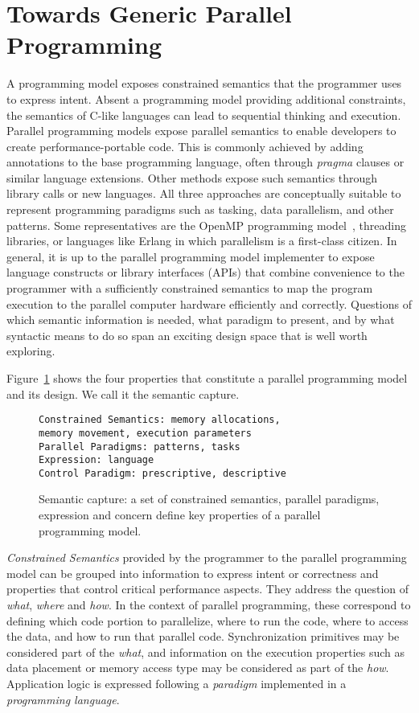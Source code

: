 \section{Towards Generic Parallel Programming}\label{chap:background}

A programming model exposes constrained semantics that the programmer uses to express intent. Absent a programming model providing additional constraints, the semantics of C-like languages can lead to sequential thinking and execution. Parallel programming models expose parallel semantics to enable developers to create performance-portable code. This is commonly achieved by adding annotations to the base programming language, often through \emph{pragma} clauses or similar language extensions. Other methods expose such semantics through library calls or new languages. All three approaches are conceptually suitable to represent programming paradigms such as tasking, data parallelism, and other patterns. Some representatives are the OpenMP programming model~\cite{OPENMP}, threading libraries, or languages like Erlang\cite{ERLANG} in which parallelism is a first-class citizen. In general, it is up to the parallel programming model implementer to expose language constructs or library interfaces (APIs) that combine convenience to the programmer with a sufficiently constrained semantics to map the program execution to the parallel computer hardware efficiently and correctly. Questions of which semantic information is needed, what paradigm to present, and by what syntactic means to do so span an exciting design space that is well worth exploring.

 Figure~\ref{figSemCapture} shows the four properties that constitute a parallel programming model and its design. We call it the semantic capture.

\begin{figure}[h]
\begin{verbatim}
Constrained Semantics: memory allocations, 
memory movement, execution parameters
Parallel Paradigms: patterns, tasks
Expression: language 
Control Paradigm: prescriptive, descriptive
\end{verbatim}
\caption{Semantic capture: a set of constrained semantics, parallel paradigms, expression and concern define key properties of a parallel programming model.}
\label{figSemCapture}
\end{figure}

\emph{Constrained Semantics} provided by the programmer to the parallel programming model can be grouped into information to express intent or correctness and properties that control critical performance aspects. They address the question of \emph{what}, \emph{where} and \emph{how}. In the context of parallel programming, these correspond to defining which code portion to parallelize, where to run the code, where to access the data, and how to run that parallel code. Synchronization primitives may be considered part of the \emph{what}, and information on the execution properties such as data placement or memory access type may be considered as part of the \emph{how}. Application logic is expressed following a \emph{paradigm} implemented in a \emph{programming language}.

